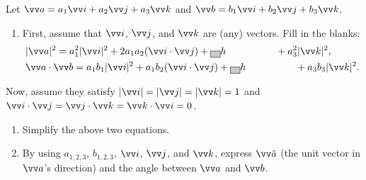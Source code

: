 \documentclass[11pt,pdfa,lastpage]{MishoNote}
\begin{document}
\begin{problems}
  \Problem[B] Let $ \vc a=a_1\vc i+a_2\vc j+a_3\vc k$ and $\vc b=b_1\vc i+b_2\vc j+b_3\vc k$.
   \label{q:ipexpand}
  \begin{enumerate}
    \item First, assume that $\vc i$, $\vc j$, and $\vc k$ are (any) vectors. Fill in the blanks:
    \begin{align*}
      &|\vc a|^2=a_1^2|\vc i|^2+2a_1a_2(\vc i\cdot\vc j)+\GrayBox{~}{h\hspace{5em}}+a_3^2|\vc k|^2,\\
      &\vc a\cdot\vc b=a_1b_1|\vc i|^2+a_1b_2(\vc i\cdot\vc j)+\GrayBox{~}{h\hspace{5em}}+a_3b_3|\vc k|^2.
    \end{align*}
  \end{enumerate}
  Now, assume they satisfy $|\vc i|=|\vc j|=|\vc k|=1$ and $\vc i\cdot\vc j=\vc j\cdot\vc k=\vc k\cdot\vc i=0$.
  \begin{enumerate}[resume]
    \item Simplify the above two equations.
    \item By using $a_{1,2,3}$, $b_{1,2,3}$, $\vc i$, $\vc j$, and $\vc k$, express $\vc{\hat a}$ (the unit vector in $\vc a$'s direction) and the angle between $\vc a$ and $\vc b$.
  \end{enumerate}


\end{problems}
\end{document}
